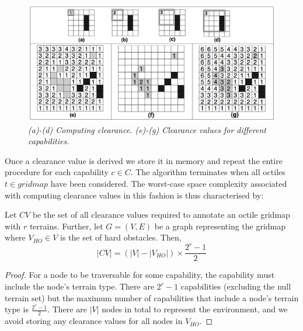 \begin{figure}[htbp]
	\vspace{-12pt}
       \caption{\emph{(a)-(d) Computing clearance. (e)-(g) Clearance values for different capabilities.}}
       \begin{center}
                       \includegraphics[scale=0.20, trim = 20mm 7mm 20mm 5mm]{diagrams/annotations.png}
       \end{center}
       \label{aha-fig:annotations}
	\vspace{-5pt}
\end{figure}

Once a clearance value is derived we store it in memory and repeat the entire procedure for each capability $c \in C$.  
The algorithm terminates when all octiles $t \in gridmap$ have been considered. 
The worst-case space complexity associated with computing clearance values in this fashion is thus characterised by: 
\begin{lemma}
\label{aha-lemma:numannotations}
Let $CV$ be the set of all clearance values required to annotate an octile gridmap with $r$ terrains. Further, let $G = (V, E)$ be a graph representing the gridmap where $V_{HO} \in V$ is the set of hard obstacles. Then, 
$$|CV| = (|V| - |V_{HO}|)\times \frac{2^{r}-1}{2}$$
\end{lemma}

\begin{proof}
For a node to be traversable for some capability, the capability must include the node's terrain type. 
There are $2^{r}-1$ capabilities (excluding the null terrain set) but the maximum number of capabilities that include a node's terrain type is $\frac{2^{r}-1}{2}$. 
There are $|V|$ nodes in total to represent the environment, and we avoid storing any clearance values for all nodes in $V_{HO}$. 
\end{proof}

